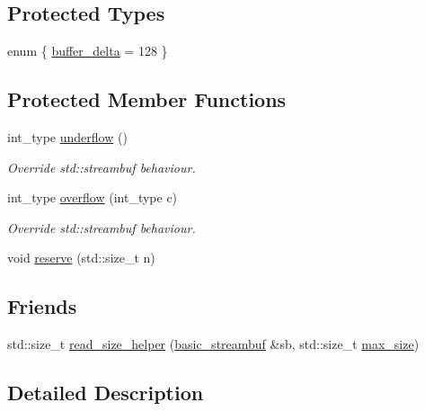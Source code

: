 \subsection*{Protected Types}
\begin{DoxyCompactItemize}
\item 
enum \{ \hyperlink{classasio_1_1basic__streambuf_a69fa699929e44c40b6194b8a4f600de0ad665b162cf9d1a1e82e74d40b3e8a329}{buffer\+\_\+delta} = 128
 \}
\end{DoxyCompactItemize}
\subsection*{Protected Member Functions}
\begin{DoxyCompactItemize}
\item 
int\+\_\+type \hyperlink{classasio_1_1basic__streambuf_ab1d0caa8e5cd788d2d7588ff79b9fd5e}{underflow} ()
\begin{DoxyCompactList}\small\item\em Override std\+::streambuf behaviour. \end{DoxyCompactList}\item 
int\+\_\+type \hyperlink{classasio_1_1basic__streambuf_a8c66d95fc706065ca0c87e0d6959e72f}{overflow} (int\+\_\+type c)
\begin{DoxyCompactList}\small\item\em Override std\+::streambuf behaviour. \end{DoxyCompactList}\item 
void \hyperlink{classasio_1_1basic__streambuf_a76d97a93b5e468f95ebe343aff1b3aa8}{reserve} (std\+::size\+\_\+t n)
\end{DoxyCompactItemize}
\subsection*{Friends}
\begin{DoxyCompactItemize}
\item 
std\+::size\+\_\+t \hyperlink{classasio_1_1basic__streambuf_af169822c1317b8129f360cb23ddd2e15}{read\+\_\+size\+\_\+helper} (\hyperlink{classasio_1_1basic__streambuf}{basic\+\_\+streambuf} \&sb, std\+::size\+\_\+t \hyperlink{classasio_1_1basic__streambuf_aee4f81154657df05c5c01cc732fe8a3a}{max\+\_\+size})
\end{DoxyCompactItemize}


\subsection{Detailed Description}
